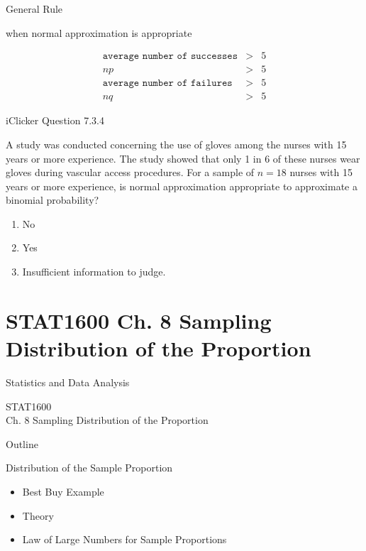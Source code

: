 \documentclass[14pt]{beamer}\usepackage[]{graphicx}\usepackage[]{color}
\begin{document}
\begin{frame}[fragile]{General Rule}

\begin{center}{\tiny{when normal approximation is appropriate}} \end{center}

\begin{eqnarray*}
\texttt{average number of successes} &>& 5 \\
np &>& 5 \\
\texttt{average number of failures} &>& 5 \\
nq &>& 5 
\end{eqnarray*}
\end{frame}

\begin{frame}[fragile]{iClicker Question 7.3.4}

A study was conducted concerning the use of gloves among the nurses with 15 years or more experience. The study showed that only 1 in 6 of these nurses wear gloves during vascular access procedures. For a sample of $n = 18$ nurses with 15 years or more experience, is normal approximation appropriate to approximate a binomial probability?

\begin{enumerate}[A]
\item No
\item Yes
\item Insufficient information to judge.
\end{enumerate}

\end{frame}



\section{STAT1600 Ch. 8 Sampling Distribution of the Proportion}

\begin{frame}[fragile]{Statistics and Data Analysis}

STAT1600 \\ Ch. 8 Sampling Distribution of the Proportion

\end{frame}

\begin{frame}[fragile]{Outline}

Distribution of the Sample Proportion  

\begin{itemize}
\item Best Buy Example
\item Theory
\item Law of Large Numbers for Sample Proportions
\end{itemize}
\end{frame}
\end{document}
